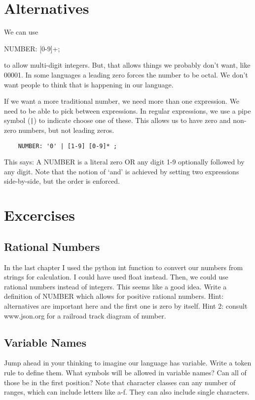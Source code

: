 \section{Alternatives}

We can use

    NUMBER: [0-9]+;

to allow multi-digit integers. But, that allows things we probably don't
want, like 00001. In some languages a leading zero forces the number to
be octal. We don't want people to think that is happening in our language.

If we want a more traditional number, we need more than one expression.
We need to be able to pick between expressions. In regular expressions,
we use a pipe symbol (\verb+|+) to indicate choose one of these. This allows us
to have zero and non-zero numbers, but not leading zeros.

{\footnotesize
\begin{verbatim}
    NUMBER: '0' | [1-9] [0-9]* ;
\end{verbatim}
}

This says: A NUMBER is a literal zero OR any digit 1-9 optionally
followed by any digit. Note that the notion of `and' is achieved by
setting two expressions side-by-side, but the order is enforced.

\section{Excercises}

\subsection{Rational Numbers}

In the last chapter I used the python int function to convert our numbers
from strings for calculation. I could have used float instead. Then,
we could use rational numbers instead of integers. This seems like
a good idea. Write a definition of NUMBER which allows for positive
rational numbers. Hint: alternatives are important here and the first
one is zero by itself. Hint 2: consult www.json.org for
a railroad track diagram of number.

\subsection{Variable Names}

Jump ahead in your thinking to imagine our language has variable.
Write a token rule to define them. What symbols will be allowed in
variable names? Can all of those be in the first position?
Note that character classes can any number of ranges, which can
include letters like a-f. They can also include single characters.
